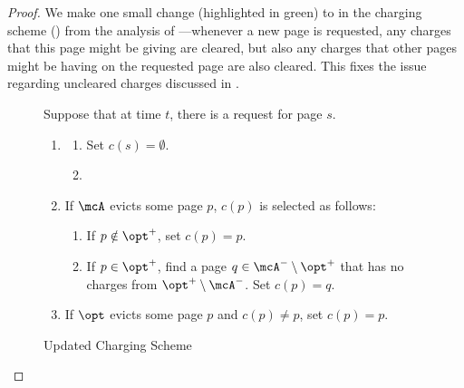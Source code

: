 \documentclass[11pt]{article}
\begin{document}
\begin{proof}
    We make one small change (highlighted in green) to  in the charging scheme () from the analysis of \cite{lund1999paging}---whenever a new page is requested, any charges that this page might be giving are cleared, but also any charges that other pages might be having on the requested page are also cleared. This fixes the issue regarding uncleared charges discussed in .
    \begin{figure}[H]
        \begin{framed}
        Suppose that at time $t$, there is a request for page $s$.
            \vspace{-2mm}
                \begin{enumerate}
                    \item \label{item:updated-clear-charges} \begin{enumerate}
                        \item \label{item:updated-clear-charges-giving} Set $c(s)=\emptyset$.
                        \item \label{item:updated-clear-charges-bearing} 
                    \end{enumerate}
                    \item \label{item:updated-assign-charge} If $\mcA$ evicts some page $p$, $c(p)$ is selected as follows:
                    \begin{enumerate}
                        \item \label{item:updated-p-not-in-opt+} If $p \notin \opt^+$, set $c(p)=p$.
                        \item \label{item:updated-p-in-opt+} If $p \in \opt^+$, find a page $q \in \mcA^- \setminus \opt^+$ that has no charges from $\opt^+ \setminus \mcA^-$. Set $c(p)=q$.
                    \end{enumerate}
                    \item \label{item:updated-opt-eviction-charge-reassign} If $\opt$ evicts some page $p$ and $c(p) \neq p$, set $c(p)=p$.
                \end{enumerate}
            \vspace{-2mm}
        \end{framed}
        \vspace{-4mm}
        \caption{Updated Charging Scheme}
        \label{fig:updated-charging-scheme}

\end{figure}
\end{proof}
\end{document}
